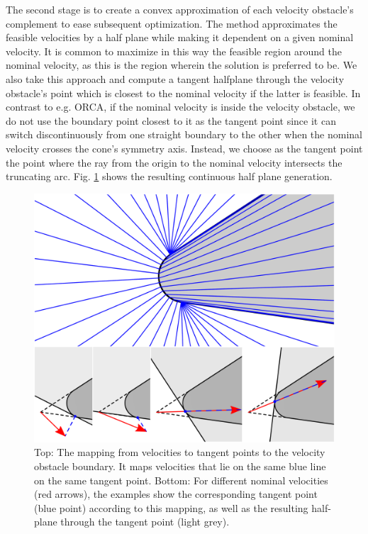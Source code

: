 \documentclass{article}
\begin{document}
The second stage is to create a convex approximation of each velocity obstacle's complement to ease subsequent optimization. The method approximates the feasible velocities by a half plane while making it dependent on a given nominal velocity. It is common to maximize in this way the feasible region around the nominal velocity, as this is the region wherein the solution is preferred to be. We also take this approach and compute a tangent halfplane through the velocity obstacle's point which is closest to the nominal velocity if the latter is feasible. In contrast to e.g. ORCA, if the nominal velocity is inside the velocity obstacle, we do not use the boundary point closest to it as the tangent point since it can switch discontinuously from one straight boundary to the other when the nominal velocity crosses the cone's symmetry axis. Instead, we choose as the tangent point the point where the ray from the origin to the nominal velocity intersects the truncating arc. Fig. \ref{fig:cvo_all} shows the resulting continuous half plane generation.

\begin{figure}
	\begin{center}
		\includegraphics[width=\textwidth]{cvo_all_no_borders.pdf}
	\end{center}
	\caption{Top: The mapping from velocities to tangent points to the velocity obstacle boundary. It maps velocities that lie on the same blue line on the same tangent point. Bottom: For different nominal velocities (red arrows), the examples show the corresponding tangent point (blue point) according to this mapping, as well as the resulting half-plane through the tangent point (light grey).}\label{fig:cvo_all}
\end{figure}
\end{document}
